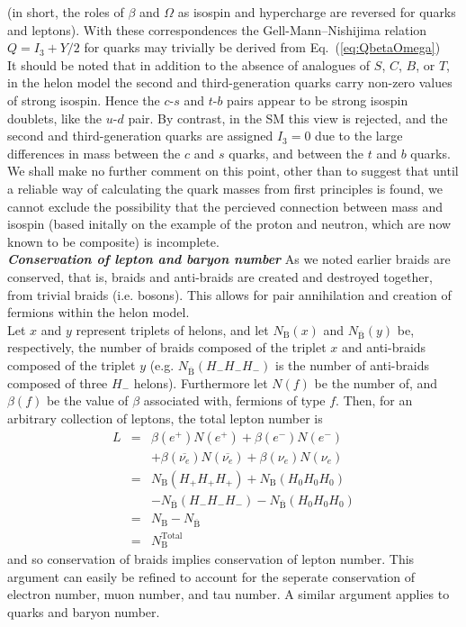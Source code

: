 \documentclass[twocolumn,showpacs,preprintnumbers,amsmath,amssymb]{revtex4}
\newcommand{\beqa}{\begin{eqnarray}}
\newcommand{\eeqa}{\end{eqnarray}}
\newcommand{\anti}[1]{\overline{#1}}
\begin{document}
(in short, the roles of $\beta$ and $\Omega$ as isospin and hypercharge are 
reversed for quarks and leptons). With these correspondences the 
Gell-Mann--Nishijima relation $Q=I_3+Y/2$ for quarks may trivially be derived from 
Eq.~(\ref{eq:QbetaOmega})\\
It should be noted that in addition to the absence of analogues of $S$, $C$, $B$, 
or $T$, in the helon model the second and third-generation quarks carry non-zero
values of strong isospin. Hence the $c$-$s$ and $t$-$b$ pairs appear to be strong 
isospin doublets, like the $u$-$d$ pair. By contrast, in the SM this view is 
rejected, and the second and third-generation quarks are assigned $I_3=0$ due to
the large differences in mass between the $c$ and $s$ quarks, and between the $t$ 
and $b$ quarks. We shall make no further comment on this point, other than to 
suggest that until a reliable way of calculating the quark masses from first 
principles is found, we cannot exclude the possibility that the percieved connection 
between mass and isospin (based initally on the example of the proton and neutron, 
which are now known to be composite) is incomplete.\\  
{\bf{\em Conservation of lepton and baryon number}}
As we noted earlier braids are conserved, that is, braids and anti-braids are
created and destroyed together, from trivial braids (i.e. bosons). This allows for 
pair annihilation and creation of 
fermions within the helon model. \\
Let $x$ and $y$ represent triplets of helons, and let $N_{\mathrm{B}}(x)$ and 
$N_{\anti{\mathrm{B}}}(y)$ be, respectively, the number of braids composed of the 
triplet $x$ and anti-braids composed of the triplet $y$ (e.g. 
$N_{\anti{\mathrm{B}}}(H_-H_-H_-)$ is the number of anti-braids composed of three 
$H_-$ helons). Furthermore let $N(f)$ be the number of, and $\beta(f)$ be the value 
of $\beta$ associated with, fermions of type $f$. Then, for an arbitrary collection 
of leptons, the total lepton number is 
\vspace{-1mm}
\beqa 
L & = & \beta(e^+)N(e^+)+ \beta(e^-)N(e^-) \nonumber \\
  &   &  + \beta(\anti{\nu_e})N(\anti{\nu_e})+
        \beta(\nu_e)N(\nu_e) \nonumber\\
  & = & N_{\mathrm{B}}(H_+H_+H_+)+N_{\mathrm{B}}(H_0H_0H_0) \nonumber \\
  &   & -N_{\anti{\mathrm{B}}}(H_-H_-H_-)-N_{\anti{\mathrm{B}}}(H_0H_0H_0)
	                                                     \nonumber \\
  & = & N_\mathrm{B} - N_{\anti{\mathrm{B}}} \nonumber \\  
  & = & N_\mathrm{B}^{\mathrm{Total}} 
  \eeqa
and so conservation of braids implies conservation of lepton number. This 
argument can easily be refined to account for the seperate conservation of 
electron number, muon number, and tau number. A similar argument applies to 
quarks and baryon number.
\end{document}
